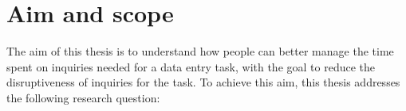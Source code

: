 
\section{Aim and scope}
The aim of this thesis is to understand how people can better manage the time spent on inquiries needed for a data entry task, with the goal to reduce the disruptiveness of inquiries for the task. To achieve this aim, this thesis addresses the following research question:

